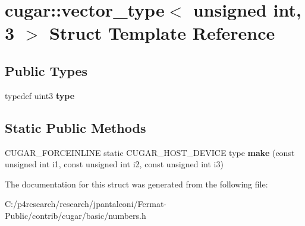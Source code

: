 \hypertarget{structcugar_1_1vector__type_3_01unsigned_01int_00_013_01_4}{}\section{cugar\+:\+:vector\+\_\+type$<$ unsigned int, 3 $>$ Struct Template Reference}
\label{structcugar_1_1vector__type_3_01unsigned_01int_00_013_01_4}
\subsection*{Public Types}
\begin{DoxyCompactItemize}
\item 
\mbox{\label{structcugar_1_1vector__type_3_01unsigned_01int_00_013_01_4_ad0ce3ba1e6bf7ba89da00aeee1e90f3c}} 
typedef uint3 {\bfseries type}
\end{DoxyCompactItemize}
\subsection*{Static Public Methods}
\begin{DoxyCompactItemize}
\item 
\mbox{\label{structcugar_1_1vector__type_3_01unsigned_01int_00_013_01_4_ae691e929466a11a53aab0487214a2ba3}} 
C\+U\+G\+A\+R\+\_\+\+F\+O\+R\+C\+E\+I\+N\+L\+I\+NE static C\+U\+G\+A\+R\+\_\+\+H\+O\+S\+T\+\_\+\+D\+E\+V\+I\+CE type {\bfseries make} (const unsigned int i1, const unsigned int i2, const unsigned int i3)
\end{DoxyCompactItemize}


The documentation for this struct was generated from the following file\+:\begin{DoxyCompactItemize}
\item 
C\+:/p4research/research/jpantaleoni/\+Fermat-\/\+Public/contrib/cugar/basic/numbers.\+h\end{DoxyCompactItemize}
